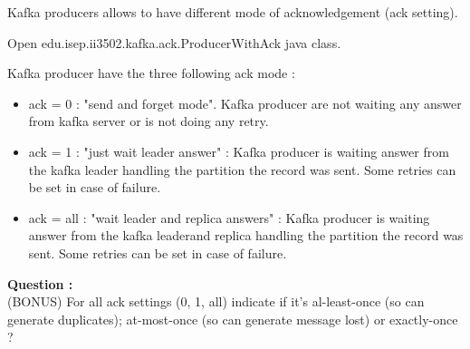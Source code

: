 \documentclass{article}
\newcounter{question}
\newenvironment{question}
    { \begin{mdframed}[backgroundcolor=gray!20] \textbf{Question \arabic{question} : } \stepcounter{question} \\}
    {  \end{mdframed}}
\begin{document}
Kafka producers allows to have different mode of acknowledgement (ack setting). 

Open edu.isep.ii3502.kafka.ack.ProducerWithAck java class. 



Kafka producer have the three following ack mode : 
\begin{itemize}
    \item ack = 0 : "send and forget mode". Kafka producer are not waiting any answer from kafka server or is not doing any retry.
    \item ack = 1 : "just wait leader answer" : Kafka producer is waiting answer from the kafka leader handling the partition the record was sent. Some retries can be set in case of failure.
    \item ack = all : "wait leader and replica answers" : Kafka producer is waiting answer from the kafka leaderand replica handling the partition the record was sent. Some retries can be set in case of failure.
\end{itemize}

\begin{question}
(BONUS) 
For all ack settings (0, 1, all) indicate if it's al-least-once (so can generate duplicates); at-most-once (so can generate message lost) or exactly-once ?
\end{question}
\end{document}
